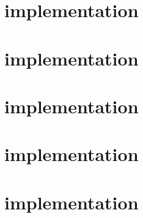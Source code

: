\documentclass[uplatex,dvipdfmx]{jsarticle} \usepackage{amsmath,amssymb,bm}
\begin{document}
\section*{implementation}


\section*{implementation}


\section*{implementation}


\section*{implementation}


\section*{implementation}







\vspace{\baselineskip}
\begin{paracol}{2}
\switchcolumn
\end{paracol}
\end{document}
